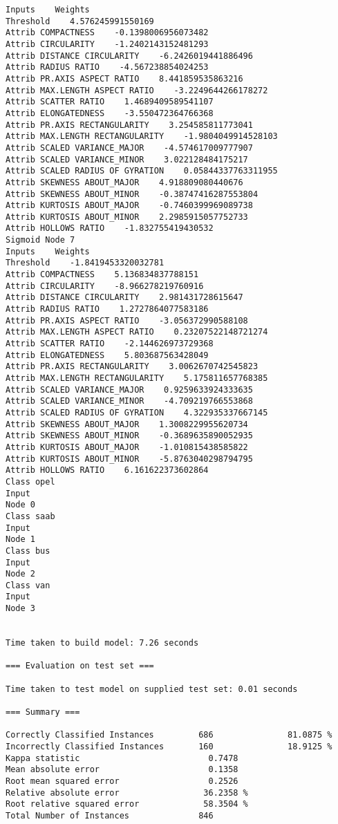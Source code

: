 \documentclass[
	article,			%
	11pt,				%
	oneside,			%
	a4paper,			%
	english,			%
	brazil,				%
	sumario=tradicional
	]{abntex2}
\begin{document}
\begin{lstlisting}
Inputs    Weights
Threshold    4.576245991550169
Attrib COMPACTNESS    -0.1398006956073482
Attrib CIRCULARITY    -1.2402143152481293
Attrib DISTANCE CIRCULARITY    -6.2426019441886496
Attrib RADIUS RATIO    -4.567238854024253
Attrib PR.AXIS ASPECT RATIO    8.441859535863216
Attrib MAX.LENGTH ASPECT RATIO    -3.2249644266178272
Attrib SCATTER RATIO    1.4689409589541107
Attrib ELONGATEDNESS    -3.550472364766368
Attrib PR.AXIS RECTANGULARITY    3.254585811773041
Attrib MAX.LENGTH RECTANGULARITY    -1.9804049914528103
Attrib SCALED VARIANCE_MAJOR    -4.574617009777907
Attrib SCALED VARIANCE_MINOR    3.022128484175217
Attrib SCALED RADIUS OF GYRATION    0.05844337763311955
Attrib SKEWNESS ABOUT_MAJOR    4.918809080440676
Attrib SKEWNESS ABOUT_MINOR    -0.38747416287553804
Attrib KURTOSIS ABOUT_MAJOR    -0.7460399969089738
Attrib KURTOSIS ABOUT_MINOR    2.2985915057752733
Attrib HOLLOWS RATIO    -1.832755419430532
Sigmoid Node 7
Inputs    Weights
Threshold    -1.8419453320032781
Attrib COMPACTNESS    5.136834837788151
Attrib CIRCULARITY    -8.966278219760916
Attrib DISTANCE CIRCULARITY    2.981431728615647
Attrib RADIUS RATIO    1.2727864077583186
Attrib PR.AXIS ASPECT RATIO    -3.056372990588108
Attrib MAX.LENGTH ASPECT RATIO    0.23207522148721274
Attrib SCATTER RATIO    -2.144626973729368
Attrib ELONGATEDNESS    5.803687563428049
Attrib PR.AXIS RECTANGULARITY    3.0062670742545823
Attrib MAX.LENGTH RECTANGULARITY    5.175811657768385
Attrib SCALED VARIANCE_MAJOR    0.9259633924333635
Attrib SCALED VARIANCE_MINOR    -4.709219766553868
Attrib SCALED RADIUS OF GYRATION    4.322935337667145
Attrib SKEWNESS ABOUT_MAJOR    1.3008229955620734
Attrib SKEWNESS ABOUT_MINOR    -0.3689635890052935
Attrib KURTOSIS ABOUT_MAJOR    -1.010815438585822
Attrib KURTOSIS ABOUT_MINOR    -5.8763040298794795
Attrib HOLLOWS RATIO    6.161622373602864
Class opel
Input
Node 0
Class saab
Input
Node 1
Class bus
Input
Node 2
Class van
Input
Node 3


Time taken to build model: 7.26 seconds

=== Evaluation on test set ===

Time taken to test model on supplied test set: 0.01 seconds

=== Summary ===

Correctly Classified Instances         686               81.0875 %
Incorrectly Classified Instances       160               18.9125 %
Kappa statistic                          0.7478
Mean absolute error                      0.1358
Root mean squared error                  0.2526
Relative absolute error                 36.2358 %
Root relative squared error             58.3504 %
Total Number of Instances              846     


\end{lstlisting}
\end{document}
